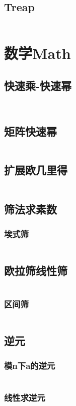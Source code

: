 \documentclass[twoside,sub3section,UTF8]{ctexart}						%
\begin{document}
	\subsection{Treap}
		\inputminted{c++}{"Data Structure/treap.cpp"}
		
\newpage
\section{数学Math}
	\subsection{快速乘-快速幂}
		\inputminted{c++}{"Maths/fastmul.cpp"}
		\inputminted{c++}{"Maths/fastpow.cpp"}
	\subsection{矩阵快速幂}
		\inputminted{c++}{"Maths/MatrixFastpow.cpp"}	
	\subsection{扩展欧几里得}
		\inputminted{c++}{"Maths/exgcd.cpp"}
	\subsection{筛法求素数}
		\subsubsection{埃式筛}
			\inputminted{c++}{"Maths/Prime/EratosthenesSieve.cpp"}
		\subsection{欧拉筛线性筛}
			\inputminted{c++}{"Maths/Prime/EularSieve.cpp"}
		\subsubsection{区间筛}
			\inputminted{c++}{"Maths/Prime/SegmentSieve.cpp"}
	\subsection{逆元}
		\subsubsection{模n下a的逆元}
			\inputminted{c++}{"Maths/Rev/modnreva.cpp"}
		\subsubsection{线性求逆元}
			\inputminted{c++}{"Maths/Rev/rev.cpp"}
\end{document}
